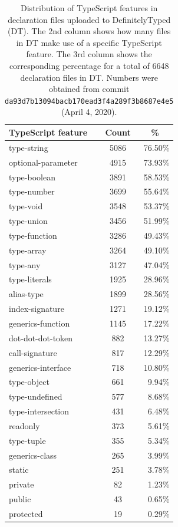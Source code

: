 \documentclass[english,cleveref,autoref,submission]{programming}
\begin{document}
\begin{table}[tp]
  \begin{center}
    \begin{tabular}{ |l|c|r| } 
      \hline
      \textbf{TypeScript feature} & \textbf{Count} & \multicolumn{1}{|c|}{\textbf{\%}} \\ 
      \hline
      type-string & 5086 & 76.50\% \\
      optional-parameter & 4915 & 73.93\% \\
      type-boolean & 3891 & 58.53\% \\
      type-number & 3699 & 55.64\% \\
      type-void & 3548 & 53.37\% \\
      type-union & 3456 & 51.99\% \\
      type-function & 3286 & 49.43\% \\
      type-array & 3264 & 49.10\% \\
      type-any & 3127 & 47.04\% \\
      type-literals & 1925 & 28.96\% \\
      alias-type & 1899 & 28.56\% \\
      index-signature & 1271 & 19.12\% \\
      generics-function & 1145 & 17.22\% \\
      dot-dot-dot-token & 882 & 13.27\% \\
      call-signature & 817 & 12.29\% \\
      generics-interface & 718 & 10.80\% \\
      type-object & 661 & 9.94\% \\
      type-undefined & 577 & 8.68\% \\
      type-intersection & 431 & 6.48\% \\
      readonly & 373 & 5.61\% \\
      type-tuple & 355 & 5.34\% \\
      generics-class & 265 & 3.99\% \\
      static & 251 & 3.78\% \\
      private & 82 & 1.23\% \\
      public & 43 & 0.65\% \\
      protected & 19 & 0.29\% \\
      \hline
    \end{tabular}
  \end{center}
  \caption{Distribution of TypeScript features in declaration files uploaded to DefinitelyTyped (DT). The 2nd column shows how many files in DT make use of a specific TypeScript feature. The 3rd column shows the corresponding percentage for a total of 6648 declaration files in DT. Numbers were obtained from commit \texttt{da93d7b13094bacb170ead3f4a289f3b8687e4e5} (April 4, 2020).}
  \label{tab:dts-parse-stats}
\end{table}
\end{document}
